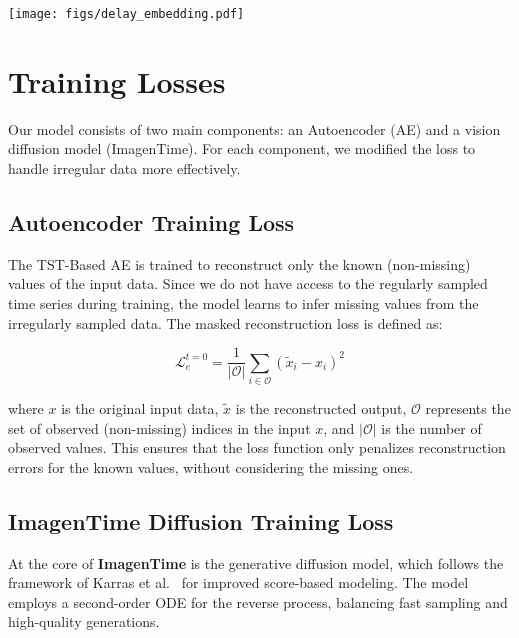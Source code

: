 \documentclass{article}
\theoremstyle{plain}
\theoremstyle{definition}
\theoremstyle{remark}
\begin{document}
{\begin{table}[!h]
\begin{minipage}[t]{0.75\textwidth}
{\begin{tabular}{ll|cc|cc|cc}
        \end{tabular}
        }
    \end{minipage}
    \hfill
    \begin{minipage}[b]{0.2\textwidth}
        \centering
        \texttt{[image: figs/delay\_embedding.pdf]} 
        \label{fig:delay_embedding}
        \vspace{-1cm}
    \end{minipage}
\end{table}


\section{Training Losses}
\label{app:loss_function}
Our model consists of two main components: an Autoencoder (AE) and a vision diffusion model (ImagenTime). For each component, we modified the loss to handle irregular data more effectively.

\subsection{Autoencoder Training Loss}

The TST-Based AE is trained to reconstruct only the known (non-missing) values of the input data. Since we do not have access to the regularly sampled time series during training, the model learns to infer missing values from the irregularly sampled data. The masked reconstruction loss is defined as:

\begin{equation}
    \mathcal{L}_{e}^{t=0} = \frac{1}{|\mathcal{O}|} \sum_{i \in \mathcal{O}} (\tilde{x}_i - x_i)^2
\end{equation}

where $x$ is the original input data, $\tilde{x}$ is the reconstructed output, $\mathcal{O}$ represents the set of observed (non-missing) indices in the input $x$, and $|\mathcal{O}|$ is the number of observed values. This ensures that the loss function only penalizes reconstruction errors for the known values, without considering the missing ones.

\subsection{ImagenTime Diffusion Training Loss}

At the core of \textbf{ImagenTime} is the generative diffusion model, which follows the framework of Karras et al.~\cite{karras2022elucidating} for improved score-based modeling. The model employs a second-order ODE for the reverse process, balancing fast sampling and high-quality generations.

}
\end{document}
